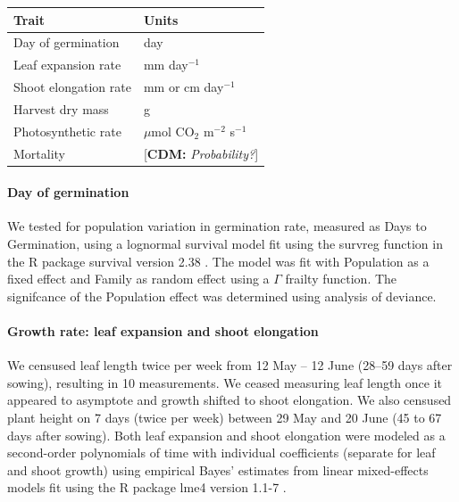 \documentclass[11pt, oneside]{article}
\newcommand{\pkg}[1]{{\fontseries{b}\selectfont #1}}
\newcommand{\cdm}[1]{{ \color{magenta} [{\bf{CDM:}} {\em#1}]}} %
\begin{document}
\begin{table}[ht]
   \centering
   \begin{tabular}{@{} ll @{}}
      \toprule
  Trait & Units \\
      \midrule
  Day of germination  & day \\
  Leaf expansion rate  &  mm day$^{-1}$  \\
  Shoot elongation rate  &  mm or cm day$^{-1}$  \\
  Harvest dry mass &  g  \\
  Photosynthetic rate &  $\mu$mol CO$_2$ m$^{-2}$ s$^{-1}$\\
  Mortality &  \cdm{Probability?}  \\
	    \bottomrule
   \end{tabular}
   \label{table:Table_traits}
\end{table}

\paragraph{Day of germination} We tested for population variation in germination rate, measured as Days to Germination, using a lognormal survival model fit using the survreg function in the R package \pkg{survival} version 2.38 \citep{Therneau_2015}. The model was fit with Population as a fixed effect and Family as random effect using a $\Gamma$ frailty function. The signifcance of the Population effect was determined using analysis of deviance.


\paragraph{Growth rate: leaf expansion and shoot elongation}

We censused leaf length twice per week from 12 May -- 12 June (28--59 days after sowing), resulting in 10 measurements. We ceased measuring leaf length once it appeared to asymptote and growth shifted to shoot elongation.  We also censused plant height on 7 days (twice per week) between 29 May and 20 June (45 to 67 days after sowing). Both leaf expansion and shoot elongation were modeled as a second-order polynomials of time with individual coefficients (separate for leaf and shoot growth) using empirical Bayes' estimates from linear mixed-effects models fit using the R package \pkg{lme4} version 1.1-7 \citep{Bates_etal_2014}.
\end{document}
